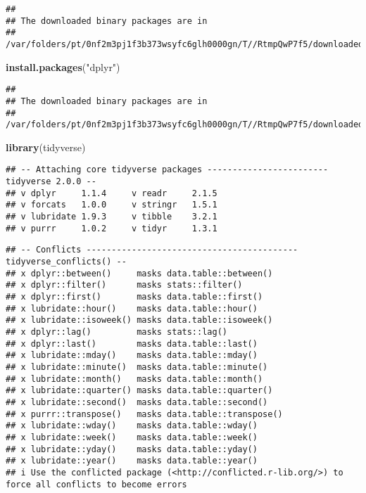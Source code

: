 \documentclass[
]{article}
\newenvironment{Shaded}{\begin{snugshade}}{\end{snugshade}}
\newcommand{\FunctionTok}[1]{\textcolor[rgb]{0.13,0.29,0.53}{\textbf{#1}}}
\newcommand{\NormalTok}[1]{#1}
\newcommand{\StringTok}[1]{\textcolor[rgb]{0.31,0.60,0.02}{#1}}
\begin{document}
\begin{verbatim}
## 
## The downloaded binary packages are in
##  /var/folders/pt/0nf2m3pj1f3b373wsyfc6glh0000gn/T//RtmpQwP7f5/downloaded_packages
\end{verbatim}

\begin{Shaded}
\begin{Highlighting}[]
\FunctionTok{install.packages}\NormalTok{(}\StringTok{"dplyr"}\NormalTok{)}
\end{Highlighting}
\end{Shaded}

\begin{verbatim}
## 
## The downloaded binary packages are in
##  /var/folders/pt/0nf2m3pj1f3b373wsyfc6glh0000gn/T//RtmpQwP7f5/downloaded_packages
\end{verbatim}

\begin{Shaded}
\begin{Highlighting}[]
\FunctionTok{library}\NormalTok{(tidyverse)}
\end{Highlighting}
\end{Shaded}

\begin{verbatim}
## -- Attaching core tidyverse packages ------------------------ tidyverse 2.0.0 --
## v dplyr     1.1.4     v readr     2.1.5
## v forcats   1.0.0     v stringr   1.5.1
## v lubridate 1.9.3     v tibble    3.2.1
## v purrr     1.0.2     v tidyr     1.3.1
\end{verbatim}

\begin{verbatim}
## -- Conflicts ------------------------------------------ tidyverse_conflicts() --
## x dplyr::between()     masks data.table::between()
## x dplyr::filter()      masks stats::filter()
## x dplyr::first()       masks data.table::first()
## x lubridate::hour()    masks data.table::hour()
## x lubridate::isoweek() masks data.table::isoweek()
## x dplyr::lag()         masks stats::lag()
## x dplyr::last()        masks data.table::last()
## x lubridate::mday()    masks data.table::mday()
## x lubridate::minute()  masks data.table::minute()
## x lubridate::month()   masks data.table::month()
## x lubridate::quarter() masks data.table::quarter()
## x lubridate::second()  masks data.table::second()
## x purrr::transpose()   masks data.table::transpose()
## x lubridate::wday()    masks data.table::wday()
## x lubridate::week()    masks data.table::week()
## x lubridate::yday()    masks data.table::yday()
## x lubridate::year()    masks data.table::year()
## i Use the conflicted package (<http://conflicted.r-lib.org/>) to force all conflicts to become errors
\end{verbatim}
\end{document}
